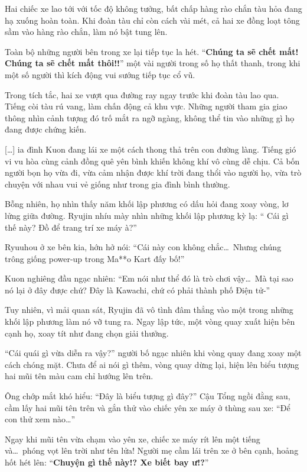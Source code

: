 \documentclass[../main.tex]{subfiles}
\begin{document}
Hai chiếc xe lao tới với tốc độ không tưởng, bất chấp hàng rào chắn tàu hỏa đang hạ xuống hoàn toàn. Khi đoàn tàu chỉ còn cách vài mét, cả hai xe đồng loạt tông sầm vào hàng rào chắn, làm nó bật tung lên.

Toàn bộ những người bên trong xe lại tiếp tục la hét. ``\textbf{Chúng ta sẽ chết mất! Chúng ta sẽ chết mất thôi!!}'' một vài người trong số họ thất thanh, trong khi một số người thì kích động vui sướng tiếp tục cổ vũ.

Trong tích tắc, hai xe vượt qua đường ray ngay trước khi đoàn tàu lao qua. Tiếng còi tàu rú vang, làm chấn động cả khu vực. Những người tham gia giao thông nhìn cảnh tượng đó trố mắt ra ngỡ ngàng, không thể tin vào những gì họ đang được chứng kiến.

    [\dots] ia đình Kuon đang lái xe một cách thong thả trên con đường làng. Tiếng gió vi vu hòa cùng cảnh đồng quê yên bình khiến không khí vô cùng dễ chịu. Cả bốn người bọn họ vừa đi, vừa cảm nhận được khí trời đang thổi vào người họ, vừa trò chuyện với nhau vui vẻ giống như trong gia đình bình thường.

Bỗng nhiên, họ nhìn thấy năm khối lập phương có dấu hỏi đang xoay vòng, lơ lửng giữa đường. Ryujin nhíu mày nhìn những khối lập phương kỳ lạ: ``{\color{red} Cái gì thế này? Đồ để trang trí xe máy à?}''

Ryuuhou ở xe bên kia, hớn hở nói: ``{\color{red}Cái này con không chắc\dots\ Nhưng chúng trông giống power-up trong Ma**o Kart đấy bố!}''

Kuon nghiêng đầu ngạc nhiên: ``{\color{red}Em nói như thể đó là trò chơi vậy\dots\ Mà tại sao nó lại ở đây được chứ? Đây là Kawachi, chứ có phải thành phố Điện tử-}''

Tuy nhiên, vì mải quan sát, Ryujin đã vô tình đâm thẳng vào một trong những khối lập phương làm nó vỡ tung ra. Ngay lập tức, một vòng quay xuất hiện bên cạnh họ, xoay tít như đang chọn giải thưởng.

``{\color{red}Cái quái gì vừa diễn ra vậy?}'' người bố ngạc nhiên khi vòng quay đang xoay một cách chóng mặt. Chưa để ai nói gì thêm, vòng quay dừng lại, hiện lên biểu tượng hai mũi tên màu cam chỉ hướng lên trên.

Ông chớp mắt khó hiểu: ``{\color{red}Đây là biểu tượng gì đây?}'' Cậu Tổng ngồi đằng sau, cầm lấy hai mũi tên trên và gắn thử vào chiếc yên xe máy ở thùng sau xe: ``{\color{red}Để con thử xem nào\dots}''

Ngay khi mũi tên vừa chạm vào yên xe, chiếc xe máy rít lên một tiếng và\dots\ phóng vọt lên trời như tên lửa! Người mẹ cầm lái trên xe ở bên cạnh, hoảng hốt hét lên: ``{\color{red}\textbf{Chuyện gì thế này!? Xe biết bay ư!?}}''
\end{document}
